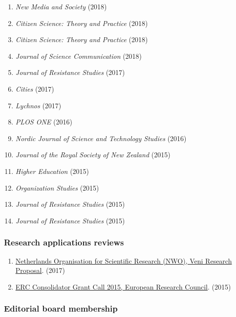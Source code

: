 \documentclass[
]{article}
\providecommand{\tightlist}{%
  \setlength{\itemsep}{0pt}\setlength{\parskip}{0pt}}
\begin{document}
\begin{enumerate}
\def\labelenumi{\arabic{enumi}.}
\tightlist
\item
  \emph{New Media and Society} (2018)
\item
  \emph{Citizen Science: Theory and Practice} (2018)
\item
  \emph{Citizen Science: Theory and Practice} (2018)
\item
  \emph{Journal of Science Communication} (2018)
\item
  \emph{Journal of Resistance Studies} (2017)
\item
  \emph{Cities} (2017)
\item
  \emph{Lychnos} (2017)
\item
  \emph{PLOS ONE} (2016)
\item
  \emph{Nordic Journal of Science and Technology Studies} (2016)
\item
  \emph{Journal of the Royal Society of New Zealand} (2015)
\item
  \emph{Higher Education} (2015)
\item
  \emph{Organization Studies} (2015)
\item
  \emph{Journal of Resistance Studies} (2015)
\item
  \emph{Journal of Resistance Studies} (2015)
\end{enumerate}

\hypertarget{research-applications-reviews}{%
\subsubsection{Research applications
reviews}\label{research-applications-reviews}}

\begin{enumerate}
\def\labelenumi{\arabic{enumi}.}
\tightlist
\item
  \href{http://files.christopherkullenberg.se/NWOreview.pdf}{Netherlands
  Organisation for Scientific Research (NWO), Veni Research Proposal}.
  (2017)
\item
  \href{http://files.christopherkullenberg.se/erc.pdf}{ERC Consolidator
  Grant Call 2015, European Research Council}. (2015)
\end{enumerate}

\hypertarget{editorial-board-membership}{%
\subsubsection{Editorial board
membership}\label{editorial-board-membership}}
\end{document}
